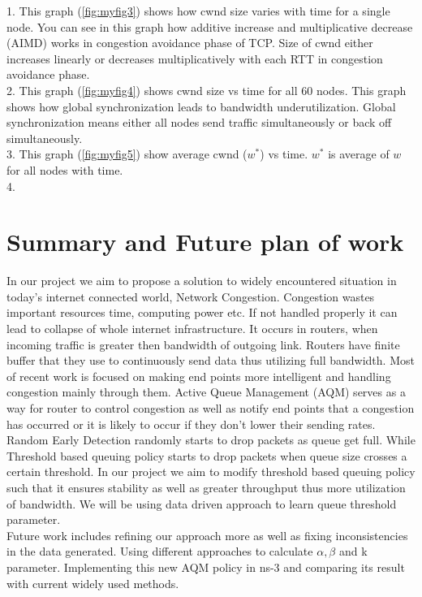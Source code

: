 1. This graph (\ref{fig:myfig3}) shows how cwnd size varies with time for a single node. You can see in this graph how additive increase and multiplicative decrease (AIMD) works in congestion avoidance phase of TCP. Size of cwnd either increases linearly or decreases multiplicatively with each RTT in congestion avoidance phase.\\ %
2. This graph (\ref{fig:myfig4}) shows cwnd size vs time for all 60 nodes. This graph shows how global synchronization leads to bandwidth underutilization. Global synchronization means either all nodes send traffic simultaneously or back off simultaneously. \\ %
3. This graph (\ref{fig:myfig5}) show average cwnd ($ w^* $) vs time. $ w^* $ is average of $ w $ for all nodes with time. \\ %
4. 

\clearpage
\section{Summary and Future plan of work}
In our project we aim to propose a solution to widely encountered situation in today's internet connected world, Network Congestion. Congestion wastes important resources time, computing power etc. If not handled properly it can lead to collapse of whole internet infrastructure. It occurs in routers, when incoming traffic is greater then bandwidth of outgoing link. Routers have finite buffer that they use to continuously send data thus utilizing full bandwidth. Most of recent work is focused on making end points more intelligent and handling congestion mainly through them. Active Queue Management (AQM) serves as a way for router to control congestion as well as notify end points that a congestion has occurred or it is likely to occur if they don't lower their sending rates. Random Early Detection randomly starts to drop packets as queue get full. While Threshold based queuing policy starts to drop packets when queue size crosses a certain threshold. In our project we aim to modify threshold based queuing policy such that it ensures stability as well as greater throughput thus more utilization of bandwidth. We will be using data driven approach to learn queue threshold parameter.\\
Future work includes refining our approach more as well as fixing inconsistencies in the data generated. Using different approaches to calculate \( \alpha, \beta \) and k parameter. Implementing this new AQM policy in ns-3 and comparing its result with current widely used methods.\\


\clearpage


